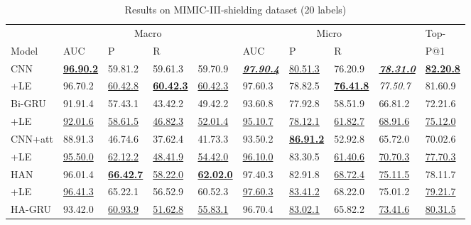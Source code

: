 \documentclass[final,5p,times,twocolumn]{elsarticle}
\begin{document}
\begin{table*}[th]
\caption{Results on MIMIC-III-shielding dataset (20 labels)}\label{mimic-iii-shielding-results}
\center
\footnotesize
\begin{threeparttable}
\begin{tabular}{lllll|llll|l}
\cline{1-10}
                      & \multicolumn{4}{c}{Macro}                 & \multicolumn{4}{c}{Micro}                 & Top-    \\
Model                 & AUC      & P        & R        &        & AUC      & P        & R        &        & P@1      \\
\cline{1-10}
CNN                   & \textbf{\underline{96.90.2}} & 59.81.2 & 59.61.3 & 59.70.9 & \textit{\textbf{\underline{97.90.4}}} & \underline{80.51.3} & 76.20.9 & \textit{\textbf{\underline{78.31.0}}} & \textbf{\underline{82.20.8}} \\
+LE                   & 96.70.2 & \underline{60.42.8} & \textbf{\underline{60.42.3}} & \underline{60.42.3} & 97.60.3 & 78.82.5 & \textbf{\underline{76.41.8}} & \textit{77.50.7} & 81.60.9 \\
\cline{1-10}
Bi-GRU                & 91.91.4 & 57.43.1 & 43.42.2 & 49.42.2 & 93.60.8 & 77.92.8 & 58.51.9 & 66.81.2 & 72.21.6 \\
+LE                   & \underline{92.01.6} & \underline{58.61.5} & \underline{46.82.3} & \underline{52.01.4} & \underline{95.10.7} & \underline{78.12.1} & \underline{61.82.7} & \underline{68.91.6} & \underline{75.12.0} \\
\cline{1-10}
CNN+att               & 88.91.3 & 46.74.6 & 37.62.4 & 41.73.3 & 93.50.2 & \textbf{\underline{86.91.2}} & 52.92.8 & 65.72.0 & 70.02.6 \\
+LE                   & \underline{95.50.0} & \underline{62.12.2} & \underline{48.41.9} & \underline{54.42.0} & \underline{96.10.0} & 83.30.5 & \underline{61.40.6} & \underline{70.70.3} & \underline{77.70.3} \\
\cline{1-10}
HAN                   & 96.01.4 & \textbf{\underline{66.42.7}} & \underline{58.22.0} & \textbf{\underline{62.02.0}} & 97.40.3 & 82.91.8 & \underline{68.72.4} & \underline{75.11.5} & 78.11.7 \\
+LE                   & \underline{96.41.3} & 65.22.1 & 56.52.9 & 60.52.3 & \underline{97.60.3} & \underline{83.41.2} & 68.22.0 & 75.01.2 & \underline{79.21.7} \\
\cline{1-10}
HA-GRU                 & 93.42.0 & \underline{60.93.9} & \underline{51.62.8} & \underline{55.83.1} & 96.70.4 & \underline{83.02.1} & 65.82.2 & \underline{73.41.6} & \underline{80.31.5} \\

\end{tabular}
\end{threeparttable}
\end{table*}
\end{document}
